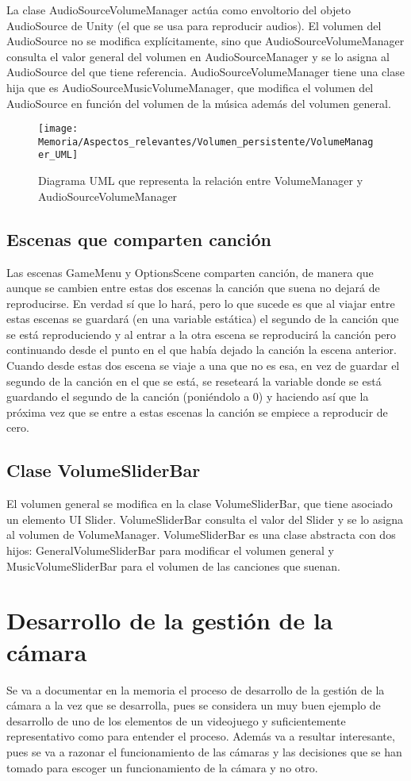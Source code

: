 La clase AudioSourceVolumeManager actúa como envoltorio del objeto AudioSource de Unity (el que se usa para reproducir audios). El volumen del AudioSource no se modifica explícitamente, sino que AudioSourceVolumeManager consulta el valor general del volumen en AudioSourceManager y se lo asigna al AudioSource del que tiene referencia. AudioSourceVolumeManager tiene una clase hija que es AudioSourceMusicVolumeManager, que modifica el volumen del AudioSource en función del volumen de la música además del volumen general.

\begin{figure}[h]
\texttt{[image: Memoria/Aspectos\_relevantes/Volumen\_persistente/VolumeManager\_UML]}
\caption{Diagrama UML que representa la relación entre VolumeManager y AudioSourceVolumeManager}
\end{figure}

\subsection{Escenas que comparten canción}
Las escenas GameMenu y OptionsScene comparten canción, de manera que aunque se cambien entre estas dos escenas la canción que suena no dejará de reproducirse. En verdad sí que lo hará, pero lo que sucede es que al viajar entre estas escenas se guardará (en una variable estática) el segundo de la canción que se está reproduciendo y al entrar a la otra escena se reproducirá la canción pero continuando desde el punto en el que había dejado la canción la escena anterior. Cuando desde estas dos escena se viaje a una que no es esa, en vez de guardar el segundo de la canción en el que se está, se reseteará la variable donde se está guardando el segundo de la canción (poniéndolo a 0) y haciendo así que la próxima vez que se entre a estas escenas la canción se empiece a reproducir de cero.

\subsection{Clase VolumeSliderBar}
El volumen general se modifica en la clase VolumeSliderBar, que tiene asociado un elemento UI Slider. VolumeSliderBar consulta el valor del Slider y se lo asigna al volumen de VolumeManager. VolumeSliderBar es una clase abstracta con dos hijos: GeneralVolumeSliderBar para modificar el volumen general y MusicVolumeSliderBar para el volumen de las canciones que suenan.

\section{Desarrollo de la gestión de la cámara}
Se va a documentar en la memoria el proceso de desarrollo de la gestión de la cámara a la vez que se desarrolla, pues se considera un muy buen ejemplo de desarrollo de uno de los elementos de un videojuego y suficientemente representativo como para entender el proceso. Además va a resultar interesante, pues se va a razonar el funcionamiento de las cámaras y las decisiones que se han tomado para escoger un funcionamiento de la cámara y no otro.

